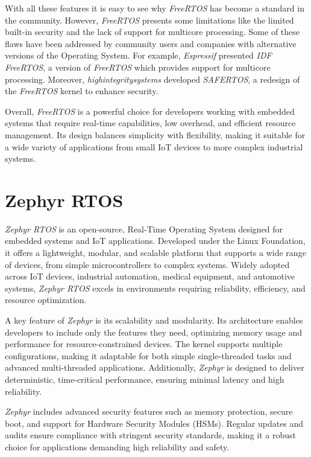 With all these features it is easy to see why \textit{FreeRTOS} has become a standard
in the community. However, \textit{FreeRTOS} presents some limitations like the
limited built-in security and the lack of support for multicore processing. Some
of these flaws have been addressed by community users and companies with alternative
versions of the Operating System. For example, \textit{Espressif} presented
\textit{IDF FreeRTOS}\cite{idfrtos}, a version of \textit{FreeRTOS} which
provides support for multicore processing. Moreover, \textit{highintegritysystems}
developed \textit{SAFERTOS}\cite{safertos}, a redesign of the \textit{FreeRTOS} kernel
to enhance security.

Overall, \textit{FreeRTOS} is a powerful choice for developers working with embedded
systems that require real-time capabilities, low overhead, and efficient resource
management. Its design balances simplicity with flexibility, making it suitable for
a wide variety of applications from small IoT devices to more complex industrial
systems.

\section{Zephyr RTOS}
\label{sec:rtos_zephyr}

\textit{Zephyr RTOS}\cite{zephyrtos} is an open-source, Real-Time Operating System
designed for embedded systems and IoT applications. Developed under the Linux
Foundation, it offers a lightweight, modular, and scalable platform that supports
a wide range of devices, from simple microcontrollers to complex systems. Widely
adopted across IoT devices, industrial automation, medical equipment, and
automotive systems, \textit{Zephyr RTOS} excels in environments requiring
reliability, efficiency, and resource optimization.

A key feature of \textit{Zephyr} is its scalability and modularity. Its
architecture enables developers to include only the features they need, optimizing
memory usage and performance for resource-constrained devices. The kernel
supports multiple configurations, making it adaptable for both simple single-threaded
tasks and advanced multi-threaded applications. Additionally, \textit{Zephyr} is
designed to deliver deterministic, time-critical performance, ensuring minimal
latency and high reliability.

\textit{Zephyr} includes advanced security features such as memory protection,
secure boot, and support for Hardware Security Modules (HSMs). Regular updates
and audits ensure compliance with stringent security standards, making it a robust
choice for applications demanding high reliability and safety.

